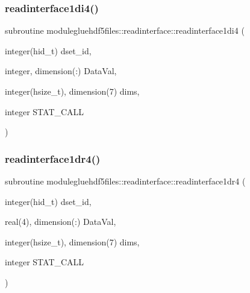 \subsubsection{\texorpdfstring{readinterface1di4()}{readinterface1di4()}}
{\footnotesize\ttfamily subroutine modulegluehdf5files\+::readinterface\+::readinterface1di4 (\begin{DoxyParamCaption}\item[{integer(hid\+\_\+t)}]{dset\+\_\+id,  }\item[{integer, dimension(\+:)}]{Data\+Val,  }\item[{integer(hsize\+\_\+t), dimension(7)}]{dims,  }\item[{integer}]{S\+T\+A\+T\+\_\+\+C\+A\+LL }\end{DoxyParamCaption})\hspace{0.3cm}{\ttfamily [private]}}

\mbox{\label{interfacemodulegluehdf5files_1_1readinterface_a962bffadc1439c2d76f71efe7f2f0d52}} 
\subsubsection{\texorpdfstring{readinterface1dr4()}{readinterface1dr4()}}
{\footnotesize\ttfamily subroutine modulegluehdf5files\+::readinterface\+::readinterface1dr4 (\begin{DoxyParamCaption}\item[{integer(hid\+\_\+t)}]{dset\+\_\+id,  }\item[{real(4), dimension(\+:)}]{Data\+Val,  }\item[{integer(hsize\+\_\+t), dimension(7)}]{dims,  }\item[{integer}]{S\+T\+A\+T\+\_\+\+C\+A\+LL }\end{DoxyParamCaption})\hspace{0.3cm}{\ttfamily [private]}}

\mbox{\label{interfacemodulegluehdf5files_1_1readinterface_ae7e0f794915a72ee472f24dcc825f99a}} 
